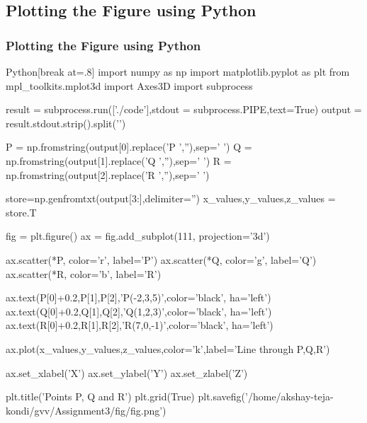 \documentclass{beamer}
\numberwithin{equation}{section}
\begin{document}
\subsection{Plotting the Figure using Python}
\begin{frame}
\frametitle{Plotting the Figure using Python}
\begin{mintedbox}{Python}[break at=.8\textheight]
import numpy as np
import matplotlib.pyplot as plt
from mpl_toolkits.mplot3d import Axes3D
import subprocess

result = subprocess.run(['./code'],stdout = subprocess.PIPE,text=True)
output = result.stdout.strip().split('\n')

P = np.fromstring(output[0].replace('P ',''),sep=' ')
Q = np.fromstring(output[1].replace('Q ',''),sep=' ')
R = np.fromstring(output[2].replace('R ',''),sep=' ')

store=np.genfromtxt(output[3:],delimiter='')
x_values,y_values,z_values = store.T

fig = plt.figure()
ax = fig.add_subplot(111, projection='3d')

ax.scatter(*P, color='r', label='P')
ax.scatter(*Q, color='g', label='Q')
ax.scatter(*R, color='b', label='R')

ax.text(P[0]+0.2,P[1],P[2],'P(-2,3,5)',color='black', ha='left')
ax.text(Q[0]+0.2,Q[1],Q[2],'Q(1,2,3)',color='black', ha='left')
ax.text(R[0]+0.2,R[1],R[2],'R(7,0,-1)',color='black', ha='left')

ax.plot(x_values,y_values,z_values,color='k',label='Line through P,Q,R')

ax.set_xlabel('X')
ax.set_ylabel('Y')
ax.set_zlabel('Z')

plt.title('Points P, Q and R')
plt.grid(True)
plt.savefig('/home/akshay-teja-kondi/gvv/Assignment3/fig/fig.png')
\end{mintedbox}
\end{frame}
\end{document}

